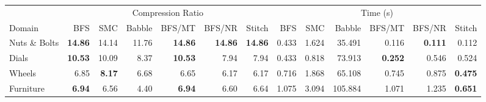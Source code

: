 \begin{tabular}{l rrrrrr|rrrrrr}
\toprule
& \multicolumn{6}{c|}{Compression Ratio} & \multicolumn{6}{c}{Time (s)} \\
\cmidrule(lr){2-7} \cmidrule(lr){8-13}
Domain & \cellcolor{estitchHighlight!9}BFS & \cellcolor{estitchHighlight!9}SMC & \cellcolor{ecorange!9}Babble & \cellcolor{estitchHighlight!9}BFS/MT & \cellcolor{estitchHighlight!9}BFS/NR & \cellcolor{ecblue!9}Stitch & \cellcolor{estitchHighlight!9}BFS & \cellcolor{estitchHighlight!9}SMC & \cellcolor{ecorange!9}Babble & \cellcolor{estitchHighlight!9}BFS/MT & \cellcolor{estitchHighlight!9}BFS/NR & \cellcolor{ecblue!9}Stitch \\
\midrule
Nuts \& Bolts & \cellcolor{estitchHighlight!9}\textbf{14.86} & \cellcolor{estitchHighlight!9}14.14 & \cellcolor{ecorange!9}11.76 & \cellcolor{estitchHighlight!9}\textbf{14.86} & \cellcolor{estitchHighlight!9}\textbf{14.86} & \cellcolor{ecblue!9}\textbf{14.86} & \cellcolor{estitchHighlight!9}0.433 & \cellcolor{estitchHighlight!9}1.624 & \cellcolor{ecorange!9}35.491 & \cellcolor{estitchHighlight!9}0.116 & \cellcolor{estitchHighlight!9}\textbf{0.111} & \cellcolor{ecblue!9}0.112 \\
Dials & \cellcolor{estitchHighlight!9}\textbf{10.53} & \cellcolor{estitchHighlight!9}10.09 & \cellcolor{ecorange!9}8.37 & \cellcolor{estitchHighlight!9}\textbf{10.53} & \cellcolor{estitchHighlight!9}7.94 & \cellcolor{ecblue!9}7.94 & \cellcolor{estitchHighlight!9}0.433 & \cellcolor{estitchHighlight!9}0.818 & \cellcolor{ecorange!9}73.913 & \cellcolor{estitchHighlight!9}\textbf{0.252} & \cellcolor{estitchHighlight!9}0.546 & \cellcolor{ecblue!9}0.524 \\
Wheels & \cellcolor{estitchHighlight!9}6.85 & \cellcolor{estitchHighlight!9}\textbf{8.17} & \cellcolor{ecorange!9}6.68 & \cellcolor{estitchHighlight!9}6.65 & \cellcolor{estitchHighlight!9}6.17 & \cellcolor{ecblue!9}6.17 & \cellcolor{estitchHighlight!9}0.716 & \cellcolor{estitchHighlight!9}1.868 & \cellcolor{ecorange!9}65.108 & \cellcolor{estitchHighlight!9}0.745 & \cellcolor{estitchHighlight!9}0.875 & \cellcolor{ecblue!9}\textbf{0.475} \\
Furniture & \cellcolor{estitchHighlight!9}\textbf{6.94} & \cellcolor{estitchHighlight!9}6.56 & \cellcolor{ecorange!9}4.40 & \cellcolor{estitchHighlight!9}\textbf{6.94} & \cellcolor{estitchHighlight!9}6.60 & \cellcolor{ecblue!9}6.64 & \cellcolor{estitchHighlight!9}1.075 & \cellcolor{estitchHighlight!9}3.094 & \cellcolor{ecorange!9}105.884 & \cellcolor{estitchHighlight!9}1.071 & \cellcolor{estitchHighlight!9}1.235 & \cellcolor{ecblue!9}\textbf{0.651} \\

\end{tabular}
